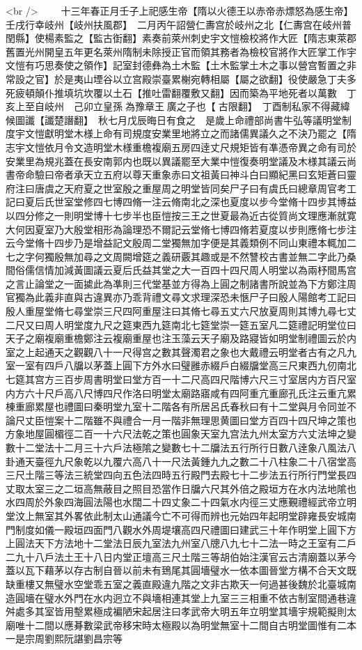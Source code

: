 <br />
　　十三年春正月壬子上祀感生帝【隋以火德王以赤帝赤熛怒為感生帝】壬戌行幸岐州【岐州扶風郡】　二月丙午詔營仁夀宫於岐州之北【仁夀宫在岐州普閏縣】使楊素監之【監古衘翻】素奏前萊州刺史宇文愷檢校將作大匠【隋志東萊郡舊置光州開皇五年更名萊州隋制未除授正官而領其務者為檢校官將作大匠掌工作宇文愷有巧思奏使之領作】記室封德彝為土木監【土木監掌土木之事以營宫暫置之非常設之官】於是夷山堙谷以立宫殿崇臺累榭宛轉相屬【屬之欲翻】役使嚴急丁夫多死疲頓顛仆推填坑坎覆以土石【推吐雷翻覆敷又翻】因而築為平地死者以萬數　丁亥上至自岐州　己卯立皇孫為豫章王廣之子也【古限翻】　丁酉制私家不得藏緯候圖讖【讖楚譖翻】　秋七月戊辰晦日有食之　是歲上命禮部尚書牛弘等議明堂制度宇文愷獻明堂木様上命有司規度安業里地將立之而諸儒異議久之不決乃罷之【隋志宇文愷依月令文造明堂木様重檐複廟五房四逹丈尺規矩皆有凖憑帝異之命有司於安業里為規兆蓋在長安南郭内也既以異議罷至大業中愷復奏明堂議及木様其議云尚書帝命驗曰帝者承天立五府以尊天重象赤曰文祖黃曰神斗白曰顯紀黑曰玄矩蒼曰靈府注曰唐虞之天府夏之世室殷之重屋周之明堂皆同矣尸子曰有虞氏曰總章周官考工記曰夏后氏世室堂修四七博四脩一注云脩南北之深也夏度以步今堂脩十四步其博益以四分修之一則明堂博十七步半也臣愷按三王之世夏最為近古從質尚文理應漸就寛大何因夏室乃大殷堂相形為論理恐不爾記云堂脩七博四脩若夏度以步則應脩七步注云今堂脩十四步乃是增益記文殷周二堂獨無加字便是其義類例不同山東禮本輒加二七之字何獨殷無加尋之文周闕增筵之義研覈其趣或是不然讐校古書並無二字此乃桑間俗儒信情加減黃圖議云夏后氏益其堂之大一百四十四尺周人明堂以為兩杼間馬宫之言止論堂之一面㨿此為凖則三代堂基並方得為上圓之制諸書所說並為下方鄭注周官獨為此義非直與古違異亦乃乖背禮文尋文求理深恐未愜尸子曰殷人陽館考工記曰殷人重屋堂脩七尋堂崇三尺四阿重屋注曰其脩七尋五丈六尺放夏周則其博九尋七丈二尺又曰周人明堂度九尺之筵東西九筵南北七筵堂崇一筵五室凡二筵禮記明堂位曰天子之廟複廟重檐鄭注云複廟重屋也注玉藻云天子廟及路寢皆如明堂制禮圖云於内室之上起通天之觀觀八十一尺得宫之數其聲濁君之象也大戴禮云明堂者古有之凡九室一室有四戶八牖以茅蓋上圓下方外水曰璧雝赤綴戶白綴牖堂高三尺東西九仞南北七筵其宫方三百步周書明堂曰堂方百一十二尺高四尺階博六尺三寸室居内方百尺室内方六十尺戶高八尺博四尺作洛曰明堂太廟路寤咸有四阿重亢重廊孔氏注云重亢累棟重廊累屋也禮圖曰秦明堂九室十二階各有所居呂氏春秋曰有十二堂與月令同並不論尺丈臣愷案十二階雖不與禮合一月一階非無理思黄圖曰堂方百四十四尺坤之策也方象地屋圓楣徑二百一十六尺法乾之策也圓象天室九宫法九州太室方六丈法坤之變數十二堂法十二月三十六戶法極隂之變數七十二牖法五行所行日數八逹象八風法八卦通天臺徑九尺象乾以九覆六高八十一尺法黃鍾九九之數二十八柱象二十八宿堂高三尺土階三等法三統堂四向五色法四時五行殿門去殿七十二步法五行所行門堂長四丈取太室三之二垣高無蔽目之照目恐當作日牖六尺其外倍之殿垣方在水内法地隂也水四周於外象四海圓法陽也水闊二十四丈象二十四氣水内徑三丈應覲禮經武帝立明堂汶上無室其外畧依此制太山通議今亡不可得而辨也元始四年起明堂辟雍長安城南門制度如儀一殿垣四面門八觀水外周堤壤高四尺禮圖曰建武三十年作明堂上圓下方上圓法天下方法地十二堂法日辰九室法九州室八牕八九七十二法一時之王室有二戶二九十八戶法土王十八日内堂正壇高三尺土階三等胡伯始注漢官云古清廟蓋以茅今蓋以瓦下藉茅以存古制自晉以前未有鵄尾其圓墻璧水一依本圖晉堂方構不合天文既缺重樓又無璧水空堂乖五室之義直殿違九階之文非古欺天一何過甚後魏於北臺城南造圓墻在璧水外門在水内迥立不與墻相連其堂上九室三三相重不依古制室間通巷違舛處多其室皆用墼累極成褊陋宋起居注曰孝武帝大明五年立明堂其墻宇規範擬則太廟唯十二間以應朞數梁武帝移宋時太極殿以為明堂無室十二間自古明堂圖惟有二本一是宗周劉熙阮諶劉昌宗等
